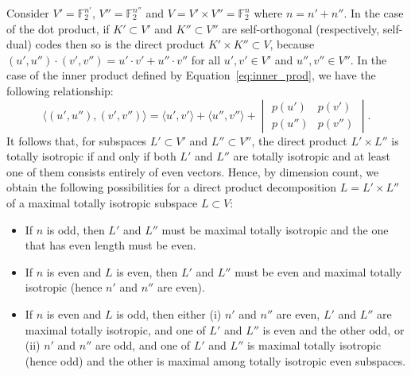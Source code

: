 \documentclass[a4paper,reqno]{amsart}
\newcommand{\FF}{\mathbb{F}}
\theoremstyle{definition}
\theoremstyle{remark} \newtheorem{remark}[theorem]{Remark}
\numberwithin{equation}{section}
\begin{document}
Consider $V'=\FF_2^{n'}$, $V''=\FF_2^{n''}$ and $V=V'\times V''=\FF_2^n$ where $n=n'+n''$. In the case of the dot product, if $K'\subset V'$ and $K''\subset V''$ are self-orthogonal (respectively, self-dual) codes then so is the direct product $K'\times K''\subset V$, because $(u',u'')\cdot(v',v'')=u'\cdot v'+u''\cdot v''$ for all $u',v'\in V'$ and $u'',v''\in V''$.
In the case of the inner product defined by Equation~\eqref{eq:inner_prod}, we have the following relationship:
\begin{equation}\label{eq:decomp_inner_prod}
\langle(u',u''),(v',v'')\rangle=\langle u',v'\rangle+\langle u'',v''\rangle+\begin{vmatrix}
p(u') & p(v')\\
p(u'') & p(v'')
\end{vmatrix}.
\end{equation}
It follows that, for subspaces $L'\subset V'$ and $L''\subset V''$, the direct product $L'\times L''$ is totally isotropic if and only if both $L'$ and $L''$ are totally isotropic and at least one of them consists entirely of even vectors. Hence, by dimension count, we obtain the following possibilities for a direct product decomposition $L=L'\times L''$ of a maximal totally isotropic subspace $L\subset V$:
\begin{itemize}
    \item If $n$ is odd, then $L'$ and $L''$ must be maximal totally isotropic and the one that has even length must be even.
    \item If $n$ is even and $L$ is even, then $L'$ and $L''$ must be even and maximal totally isotropic (hence $n'$ and $n''$ are even).
    \item If $n$ is even and $L$ is odd, then either (i) $n'$ and $n''$ are even, $L'$ and $L''$ are maximal totally isotropic, and one of $L'$ and $L''$ is even and the other odd, or (ii) $n'$ and $n''$ are odd, and one of $L'$ and $L''$ is maximal totally isotropic (hence odd) and the other is maximal among totally isotropic even subspaces.
\end{itemize}
\end{document}
